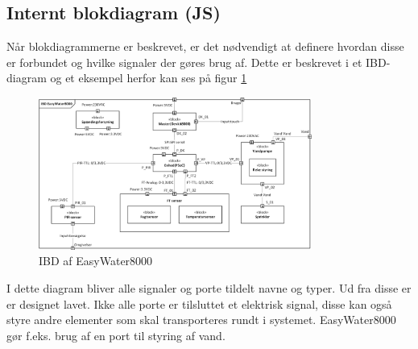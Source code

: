 \subsection{Internt blokdiagram (JS)}
Når blokdiagrammerne er beskrevet, er det nødvendigt at definere hvordan disse er forbundet og hvilke signaler der gøres brug af. Dette er beskrevet i et IBD-diagram og et eksempel herfor kan ses på figur \ref{lab:IBD}

\begin{figure}[H]
  \centering
    \includegraphics[width=0.8\textwidth]{Billeder/IBD}
    \caption{IBD af EasyWater8000}
    \label{lab:IBD}
\end{figure}

I dette diagram bliver alle signaler og porte tildelt navne og typer. Ud fra disse er er designet lavet. Ikke alle porte er tilsluttet et elektrisk signal, disse kan også styre andre elementer som skal transporteres rundt i systemet. EasyWater8000 gør f.eks. brug af en port til styring af vand.